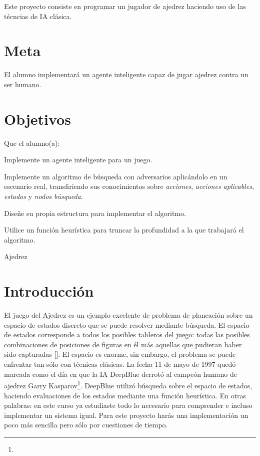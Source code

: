 
Este proyecto consiste en programar un jugador de ajedrez haciendo uso de las técncias de IA clásica.

\section{Meta}

El alumno implementará un agente inteligente capaz de jugar ajedrez contra un ser humano.

\section{Objetivos}

Que el alumno(a):
\begin{compactitem}
 \item Implemente un agente inteligente para un juego.
 \item Implemente un algoritmo de búsqueda con adversarios aplicándolo en un escenario real, transfiriendo sus conocimientos sobre \emph{acciones}, \emph{acciones aplicables}, \emph{estados} y \emph{nodos búsqueda}.
 \item Diseñe su propia estructura para implementar el algoritmo.
 \item Utilice un función heurística para truncar la profundidad a la que trabajará el algoritmo.
\end{compactitem}


\begin{auxcode}
 \caption{Ajedrez}
 \centering
\end{auxcode}


\section{Introducción}

El juego del Ajedrez es un ejemplo excelente de problema de planeación sobre un espacio de estados discreto que se puede resolver mediante búsqueda.  El espacio de estados corresponde a todos los posibles tableros del juego: todas las posibles combinaciones de posiciones de figuras en él más aquellas que pudieran haber sido capturadas [].  El espacio es enorme, sin embargo, el problema se puede enfrentar tan sólo con técnicas clásicas.  La fecha 11 de mayo de 1997 quedó marcada como el día en que la IA DeepBlue derrotó al campeón humano de ajedrez Garry Kasparov\footnote{}.  DeepBlue utilizó búsqueda sobre el espacio de estados, haciendo evaluaciones de los estados mediante una función heurística.  En otras palabras: en este curso ya estudiaste todo lo necesario para comprender e incluso implementar un sistema igual.  Para este proyecto harás una implementación un poco más sencilla pero sólo por cuestiones de tiempo.

